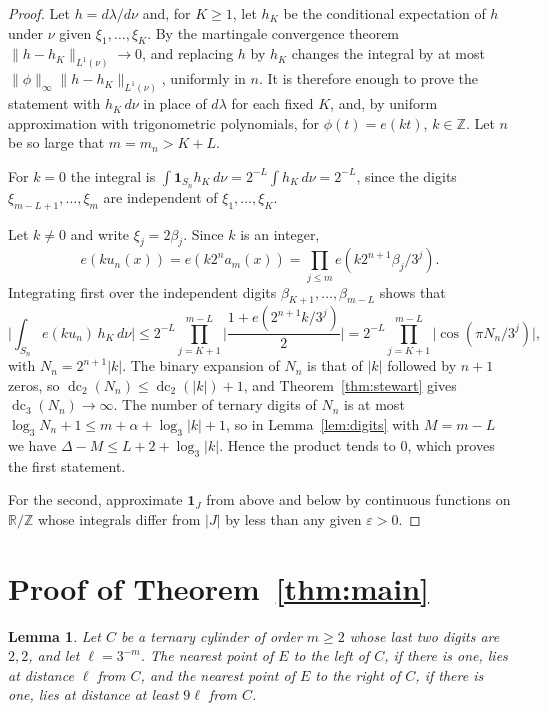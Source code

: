 \documentclass[11pt]{amsart}
\newtheorem{lemma}[theorem]{Lemma}
\theoremstyle{remark}
\newcommand{\R}{\mathbb R}
\newcommand{\Z}{\mathbb Z}
\newcommand{\one}{\mathbf 1}
\DeclareMathOperator{\dc}{dc}
\begin{document}
\begin{proof}
Let $h=d\lambda/d\nu$ and, for $K\ge1$, let $h_K$ be the conditional expectation of $h$ under $\nu$ given $\xi_1,\dots,\xi_K$. By the martingale convergence theorem $\|h-h_K\|_{L^1(\nu)}\to0$, and replacing $h$ by $h_K$ changes the integral by at most $\|\phi\|_\infty\|h-h_K\|_{L^1(\nu)}$, uniformly in $n$. It is therefore enough to prove the statement with $h_K\,d\nu$ in place of $d\lambda$ for each fixed $K$, and, by uniform approximation with trigonometric polynomials, for $\phi(t)=e(kt)$, $k\in\Z$. Let $n$ be so large that $m=m_n>K+L$.

For $k=0$ the integral is $\int\one_{S_n}h_K\,d\nu=2^{-L}\int h_K\,d\nu=2^{-L}$, since the digits $\xi_{m-L+1},\dots,\xi_m$ are independent of $\xi_1,\dots,\xi_K$.

Let $k\ne0$ and write $\xi_j=2\beta_j$. Since $k$ is an integer,
\[
e(ku_n(x))=e(k2^na_m(x))=\prod_{j\le m}e(k2^{n+1}\beta_j/3^j).
\]
Integrating first over the independent digits $\beta_{K+1},\dots,\beta_{m-L}$ shows that
\[
\Big|\int_{S_n}e(ku_n)\,h_K\,d\nu\Big|\le2^{-L}\prod_{j=K+1}^{m-L}\Big|\frac{1+e(2^{n+1}k/3^j)}2\Big|=2^{-L}\prod_{j=K+1}^{m-L}\big|\cos(\pi N_n/3^j)\big|,
\]
with $N_n=2^{n+1}|k|$. The binary expansion of $N_n$ is that of $|k|$ followed by $n+1$ zeros, so $\dc_2(N_n)\le\dc_2(|k|)+1$, and Theorem~\ref{thm:stewart} gives $\dc_3(N_n)\to\infty$. The number of ternary digits of $N_n$ is at most $\log_3N_n+1\le m+\alpha+\log_3|k|+1$, so in Lemma~\ref{lem:digits} with $M=m-L$ we have $\Delta-M\le L+2+\log_3|k|$. Hence the product tends to $0$, which proves the first statement.

For the second, approximate $\one_J$ from above and below by continuous functions on $\R/\Z$ whose integrals differ from $|J|$ by less than any given $\varepsilon>0$.
\end{proof}

\section{Proof of Theorem~\ref{thm:main}}\label{sec:proof}

\begin{lemma}\label{lem:isolate}
Let $C$ be a ternary cylinder of order $m\ge2$ whose last two digits are $2,2$, and let $\ell=3^{-m}$. The nearest point of $E$ to the left of $C$, if there is one, lies at distance $\ell$ from $C$, and the nearest point of $E$ to the right of $C$, if there is one, lies at distance at least $9\ell$ from $C$.
\end{lemma}
\end{document}
